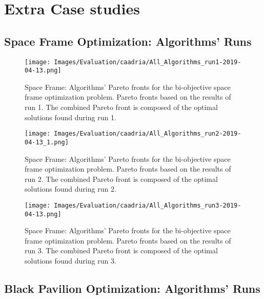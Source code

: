 \chapter{Extra Case studies}
\label{appendix:appendixB}

\section{Space Frame Optimization: Algorithms' Runs}
\label{sec:spaceframeoptimizationextra}

\begin{figure}[htbp]
	\centering
	\texttt{[image: Images/Evaluation/caadria/All\_Algorithms\_run1-2019-04-13.png]}
	\caption[Space Frame: Pareto Fronts for run 1]{Space Frame: Algorithms' Pareto fronts for the bi-objective space frame optimization problem. Pareto fronts based on the results of run 1. The combined Pareto front is composed of the optimal solutions found during run 1.}
	\label{table:spaceframerun1}
\end{figure}

\begin{figure}[htbp]
	\centering
	\texttt{[image: Images/Evaluation/caadria/All\_Algorithms\_run2-2019-04-13\_1.png]}
	\caption[Space Frame: Pareto Fronts for run 2]{Space Frame: Algorithms' Pareto fronts for the bi-objective space frame optimization problem. Pareto fronts based on the results of run 2. The combined Pareto front is composed of the optimal solutions found during run 2.}
	\label{table:spaceframesrun2}
\end{figure}

\begin{figure}[htbp]
	\centering
	\texttt{[image: Images/Evaluation/caadria/All\_Algorithms\_run3-2019-04-13.png]}
	\caption[Space Frame: Pareto Fronts for run 3]{Space Frame: Algorithms' Pareto fronts for the bi-objective space frame optimization problem. Pareto fronts based on the results of run 3. The combined Pareto front is composed of the optimal solutions found during run 3.}
	\label{table:spaceframerun3}
\end{figure}


\section{Black Pavilion Optimization: Algorithms' Runs}
\label{sec:blackpavilionextra}

